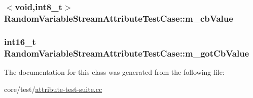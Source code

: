 \subsubsection[{\texorpdfstring{m\+\_\+cb\+Value}{m_cbValue}}]{$<$void,int8\+\_\+t$>$ Random\+Variable\+Stream\+Attribute\+Test\+Case\+::m\+\_\+cb\+Value\hspace{0.3cm}{\ttfamily [private]}}\hypertarget{classRandomVariableStreamAttributeTestCase_a20bab4601e2a135e27bb353239fdb95d}{}\label{classRandomVariableStreamAttributeTestCase_a20bab4601e2a135e27bb353239fdb95d}
\subsubsection[{\texorpdfstring{m\+\_\+got\+Cb\+Value}{m_gotCbValue}}]{\setlength{\rightskip}{0pt plus 5cm}int16\+\_\+t Random\+Variable\+Stream\+Attribute\+Test\+Case\+::m\+\_\+got\+Cb\+Value\hspace{0.3cm}{\ttfamily [private]}}\hypertarget{classRandomVariableStreamAttributeTestCase_aed588b3cd61700dcea4070136d141e09}{}\label{classRandomVariableStreamAttributeTestCase_aed588b3cd61700dcea4070136d141e09}


The documentation for this class was generated from the following file\+:\begin{DoxyCompactItemize}
\item 
core/test/\hyperlink{attribute-test-suite_8cc}{attribute-\/test-\/suite.\+cc}\end{DoxyCompactItemize}
